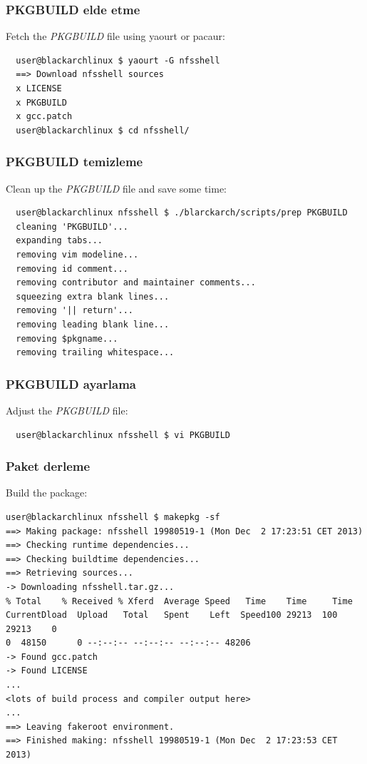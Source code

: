\documentclass[a4paper, oneside, 11pt]{book}
\begin{document}
\subsubsection{PKGBUILD elde etme}
Fetch the \textit{PKGBUILD} file using yaourt or pacaur:
\begin{lstlisting}
  user@blackarchlinux $ yaourt -G nfsshell
  ==> Download nfsshell sources
  x LICENSE
  x PKGBUILD
  x gcc.patch
  user@blackarchlinux $ cd nfsshell/
\end{lstlisting}

\subsubsection{PKGBUILD temizleme}
Clean up the \textit{PKGBUILD} file and save some time:
\begin{lstlisting}
  user@blackarchlinux nfsshell $ ./blarckarch/scripts/prep PKGBUILD
  cleaning 'PKGBUILD'...
  expanding tabs...
  removing vim modeline...
  removing id comment...
  removing contributor and maintainer comments...
  squeezing extra blank lines...
  removing '|| return'...
  removing leading blank line...
  removing $pkgname...
  removing trailing whitespace...
\end{lstlisting}

\subsubsection{PKGBUILD ayarlama}
Adjust the \textit{PKGBUILD} file:
\begin{lstlisting}
  user@blackarchlinux nfsshell $ vi PKGBUILD
\end{lstlisting}

\subsubsection{Paket derleme}
Build the package:
\begin{lstlisting}user@blackarchlinux nfsshell $ makepkg -sf
==> Making package: nfsshell 19980519-1 (Mon Dec  2 17:23:51 CET 2013)
==> Checking runtime dependencies...
==> Checking buildtime dependencies...
==> Retrieving sources...
-> Downloading nfsshell.tar.gz...
% Total    % Received % Xferd  Average Speed   Time    Time     Time
CurrentDload  Upload   Total   Spent    Left  Speed100 29213  100 29213    0
0  48150      0 --:--:-- --:--:-- --:--:-- 48206
-> Found gcc.patch
-> Found LICENSE
...
<lots of build process and compiler output here>
...
==> Leaving fakeroot environment.
==> Finished making: nfsshell 19980519-1 (Mon Dec  2 17:23:53 CET 2013)
\end{lstlisting}
\end{document}
